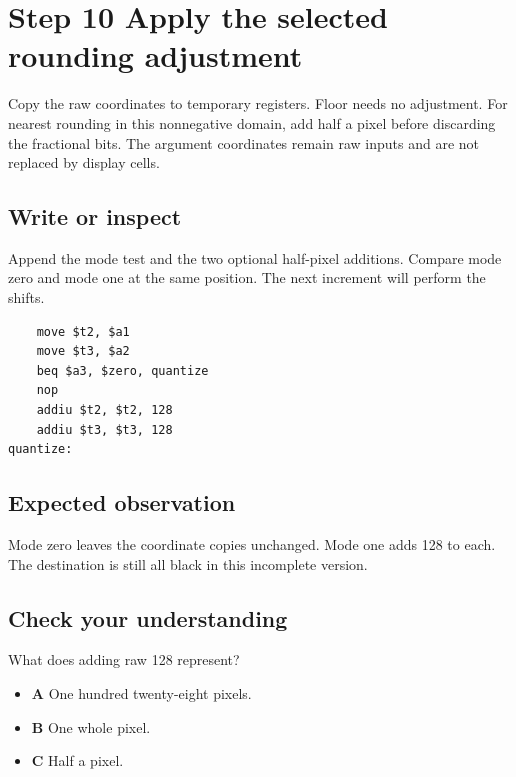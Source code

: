 \section{Step 10 Apply the selected rounding adjustment}\label{ball-s10}

Copy the raw coordinates to temporary registers. Floor needs no adjustment. For nearest rounding in this nonnegative domain, add half a pixel before discarding the fractional bits. The argument coordinates remain raw inputs and are not replaced by display cells.

\subsection{Write or inspect}
Append the mode test and the two optional half-pixel additions. Compare mode zero and mode one at the same position. The next increment will perform the shifts.

\begin{verbatim}
    move $t2, $a1
    move $t3, $a2
    beq $a3, $zero, quantize
    nop
    addiu $t2, $t2, 128
    addiu $t3, $t3, 128
quantize:
\end{verbatim}

\subsection{Expected observation}
Mode zero leaves the coordinate copies unchanged. Mode one adds 128 to each. The destination is still all black in this incomplete version.

\subsection{Check your understanding}
What does adding raw 128 represent?

\begin{itemize}
  \item \textbf{A} One hundred twenty-eight pixels.
  \item \textbf{B} One whole pixel.
  \item \textbf{C} Half a pixel.
\end{itemize}
